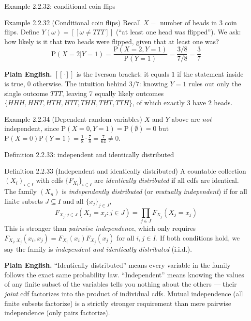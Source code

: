 \documentclass[aspectratio=169,10pt]{beamer}
\begin{document}
\begin{frame}{Example 2.2.32: conditional coin flips}
\begin{block}{Example 2.2.32 (Conditional coin flips)}
Recall $X=$ number of heads in 3 coin flips. Define $Y(\omega)=[\![\omega\neq TTT]\!]$
(``at least one head was flipped''). We ask: how likely is it that two heads
were flipped, given that at least one was?
\[ \mathrm{P}(X=2|Y=1) = \frac{\mathrm{P}(X=2,Y=1)}{\mathrm{P}(Y=1)} = \frac{3/8}{7/8} = \frac37 \]
\end{block}
\textbf{Plain English.} $[\![\cdot]\!]$ is the Iverson bracket: it equals 1 if
the statement inside is true, 0 otherwise. The intuition behind $3/7$:
knowing $Y=1$ rules out only the single outcome $TTT$, leaving 7 equally
likely outcomes $\{HHH,HHT,HTH,HTT,THH,THT,TTH\}$, of which exactly 3 have 2
heads.

\begin{block}{Example 2.2.34 (Dependent random variables)}
$X$ and $Y$ above are \emph{not} independent, since
$\mathrm{P}(X=0,Y=1)=\mathrm{P}(\emptyset)=0$ but
$\mathrm{P}(X=0)\mathrm{P}(Y=1) = \tfrac18\cdot\tfrac78 = \tfrac{7}{64}\neq 0$.
\end{block}
\end{frame}

\begin{frame}{Definition 2.2.33: independent and identically distributed}
\begin{block}{Definition 2.2.33 (Independent and identically distributed)}
A countable collection $(X_i)_{i\in I}$ with cdfs $\{F_{X_i}\}_{i\in I}$ are
\emph{identically distributed} if all cdfs are identical. The family
$(X_n)$ is \emph{independently distributed} (or \emph{mutually independent})
if for all finite subsets $J\subseteq I$ and all $\{x_j\}_{j\in J}$,
\[ F_{X_j : j\in J}(X_j = x_j : j\in J) = \prod_{j\in J} F_{X_j}(X_j=x_j) \]
This is stronger than \emph{pairwise independence}, which only requires
$F_{X_i,X_j}(x_i,x_j)=F_{X_i}(x_i)F_{X_j}(x_j)$ for all $i,j\in I$. If both
conditions hold, we say the family is \emph{independent and identically
distributed} (i.i.d.).
\end{block}
\textbf{Plain English.} ``Identically distributed'' means every variable in
the family follows the exact same probability law. ``Independent'' means
knowing the values of any finite subset of the variables tells you nothing
about the others --- their \emph{joint} cdf factorizes into the product of
individual cdfs. Mutual independence (all finite subsets factorize) is a
strictly stronger requirement than mere pairwise independence (only pairs
factorize).
\end{frame}
\end{document}

